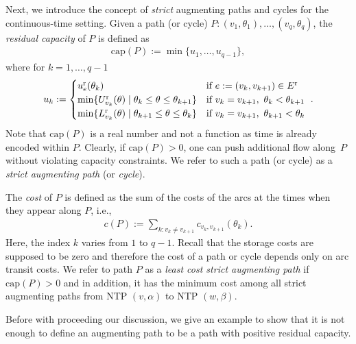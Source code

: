 \documentclass{svjour3}                     \smartqed
\newcommand{\ca}{\ensuremath{\text{cap}}}
\begin{document}
Next, we introduce the concept of \emph{strict} augmenting paths and cycles for the continuous-time setting. Given a path (or cycle) $P:(v_1,\theta_{1}),\ldots,(v_q,\theta_{q})$, the \emph{residual capacity}
of $P$ is defined as
\begin{align*}
  \ca(P):=\min\{u_1,\ldots,u_{q-1}\},
\end{align*}
where for $k=1,\ldots,q-1$
\begin{align*}
u_{k}:=\begin{cases}
        u^\text r_e(\theta_k) & \text{if } e:=(v_{k},v_{k+1})\in E^\text r\\
        \min\{U^\text r_{v_{k}}(\theta) \mid \theta_{k}\leq \theta\leq \theta_{k+1}\}
          & \text{if } v_{k}=v_{k+1},~\theta_{k}<\theta_{k+1}\\
        \min\{L^\text r_{v_{k}}(\theta)\mid \theta_{k+1}\leq \theta\leq \theta_{k}\}
          & \text{if } v_{k}=v_{k+1},~\theta_{k+1}<\theta_{k}
       \end{cases}~.
\end{align*}
Note that $\ca(P)$ is a real number and not a function as time is already encoded within $P$. Clearly, if $\ca(P)>0$, one can push additional flow along~$P$ without violating capacity constraints. We refer to such a path (or cycle) as a \emph{strict augmenting path} (or \emph{cycle}).










The \emph{cost} of $P$ is defined as the sum of the costs of the arcs at the times when they appear along $P$, i.e.,
\begin{align}
\label{eq:cost}
c(P):=\sum_{k:v_k\neq v_{k+1}} c_{v_k,v_{k+1}}(\theta_{k}).
\end{align}
Here, the index $k$ varies from $1$ to $q-1$. Recall that the storage costs are supposed to be zero and therefore the cost of a path or cycle depends only on arc transit costs.  We refer to path $P$ as a \emph{least cost strict augmenting path} if $\ca(P)>0$ and in addition, it has the minimum cost among all strict augmenting paths from NTP $(v,\alpha)$ to NTP $(w,\beta)$.

Before with proceeding our discussion, we give an example to show that it is not enough to define an augmenting path to be a path with positive residual capacity.
\end{document}

